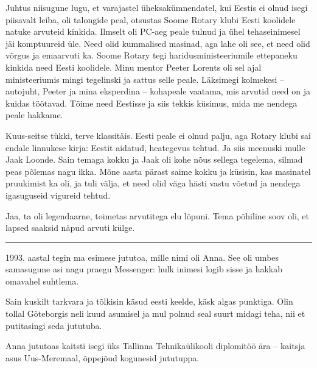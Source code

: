 Juhtus niisugune lugu, et varajastel üheksakümnendatel, kui 
Eestis ei olnud isegi piisavalt leiba, oli talongide peal, otsustas 
Soome Rotary klubi Eesti koolidele natuke arvuteid kinkida. Ilmselt oli PC-aeg peale tulnud ja ühel tehaseinimesel jäi komptuureid üle. 
Need olid kummalised masinad, aga lahe oli see, et need olid võrgus ja emaarvuti ka. Soome Rotary tegi haridusministeeriumile
ettepaneku kinkida need Eesti koolidele. 
Minu mentor Peeter Lorents oli sel ajal 
ministeeriumis mingi tegelinski ja sattus selle peale. 
Läksimegi kolmekesi -- autojuht, Peeter ja mina eksperdina -- 
kohapeale vaatama, mis arvutid need on ja kuidas töötavad. Tõime need Eestisse ja siis tekkis küsimus, mida me 
nendega peale hakkame. 


Kuus-seitse tükki, terve klassitäis. Eesti peale ei olnud palju, aga 
Rotary klubi sai endale linnukese kirja: Eestit aidatud, heategevus tehtud. Ja 
siis meenuski mulle Jaak Loonde. Sain temaga kokku ja Jaak 
oli kohe nõus sellega tegelema, silmad peas põlemas nagu ikka. Mõne aasta pärast saime kokku 
ja küsisin, kas masinatel pruukimist ka oli, ja tuli välja, et need olid väga 
hästi vastu võetud ja nendega igasuguseid vigureid tehtud. 


Jaa, ta oli legendaarne, toimetas arvutitega elu lõpuni. Tema põhiline soov oli, et lapsed saaksid näpud arvuti külge.


\bigskip
\noindent\rule{.3\textwidth}{.7pt}
\bigskip

1993. aastal tegin ma esimese 
jututoa, mille nimi oli Anna. See oli umbes samasugune asi nagu praegu Messenger: hulk inimesi logib sisse ja hakkab omavahel suhtlema. 


Sain kuskilt tarkvara ja tõlkisin käsud eesti keelde, käsk algas 
punktiga. Olin tollal Göteborgis neli kuud asumisel ja mul polnud 
seal suurt midagi teha, nii et putitasingi seda jututuba. 

Anna jututoas kaitsti isegi üks Tallinna 
Tehnikaülikooli diplomitöö ära -- kaitsja asus 
Uus-Meremaal, õppejõud kogunesid jututuppa.

